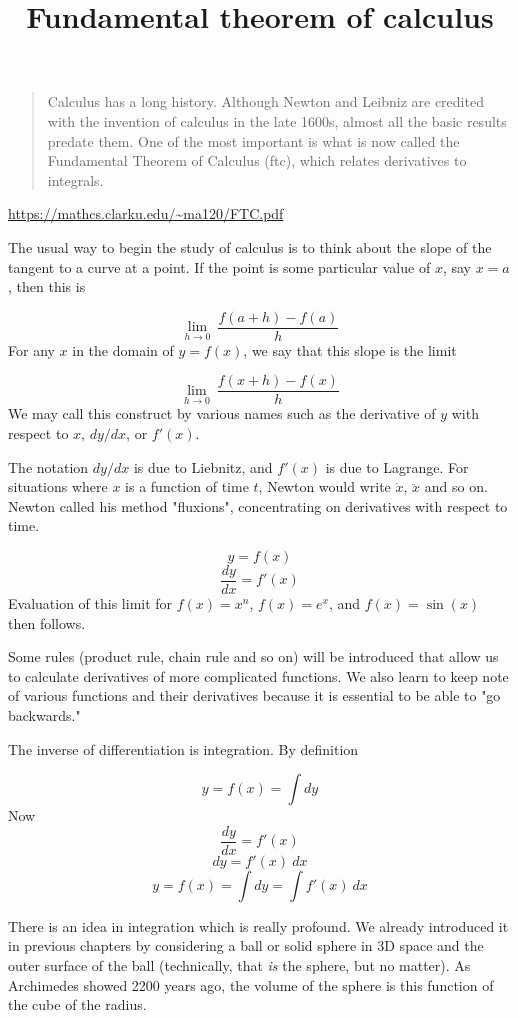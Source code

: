 \documentclass[11pt, oneside]{article}
\title{Fundamental theorem of calculus}
\date{}
\begin{document}
\maketitle
\Large


\begin{quote}Calculus has a long history. Although Newton and Leibniz are credited with the invention of calculus in the late 1600s, almost all the basic results predate them. One of the most important is what is now called the Fundamental Theorem of Calculus (ftc), which relates derivatives to integrals.\end{quote}

\url{https://mathcs.clarku.edu/~ma120/FTC.pdf}

The usual way to begin the study of calculus is to think about the slope of the tangent to a curve at a point.  If the point is some particular value of $x$, say $x=a$, then this is

\[ \lim_{h \rightarrow 0} \ \frac{f(a + h) - f(a)}{h} \]
For any $x$ in the domain of $y=f(x)$, we say that this slope is the limit

\[ \lim_{h \rightarrow 0} \ \frac{f(x + h) - f(x)}{h} \]
We may call this construct by various names such as the derivative of $y$ with respect to $x$, $dy/dx$, or $f'(x)$.  

The notation $dy/dx$ is due to Liebnitz, and $f'(x)$ is due to Lagrange.  For situations where $x$ is a function of time $t$, Newton would write $\dot{x}$, $\ddot{x}$ and so on.  Newton called his method "fluxions", concentrating on derivatives with respect to time.

\[ y = f(x) \]
\[ \frac{dy}{dx} = f'(x) \]
Evaluation of this limit for $f(x) = x^n$, $f(x) = e^x$, and $f(x) = \sin(x)$ then follows.  

Some rules (product rule, chain rule and so on) will be introduced that allow us to calculate derivatives of more complicated functions.  We also learn to keep note of various functions and their derivatives because it is essential to be able to "go backwards."

The inverse of differentiation is integration.  By definition

\[ y = f(x) = \int dy \]
Now
\[ \frac{dy}{dx} = f'(x) \]
\[ dy = f'(x) \ dx \]
\[ y = f(x) = \int dy = \int f'(x) \ dx \]

There is an idea in integration which is really profound.  We already introduced it in previous chapters by considering a ball or solid sphere in 3D space and the outer surface of the ball (technically, that \emph{is} the sphere, but no matter).  As Archimedes showed 2200 years ago, the volume of the sphere is this function of the cube of the radius.
\end{document}

